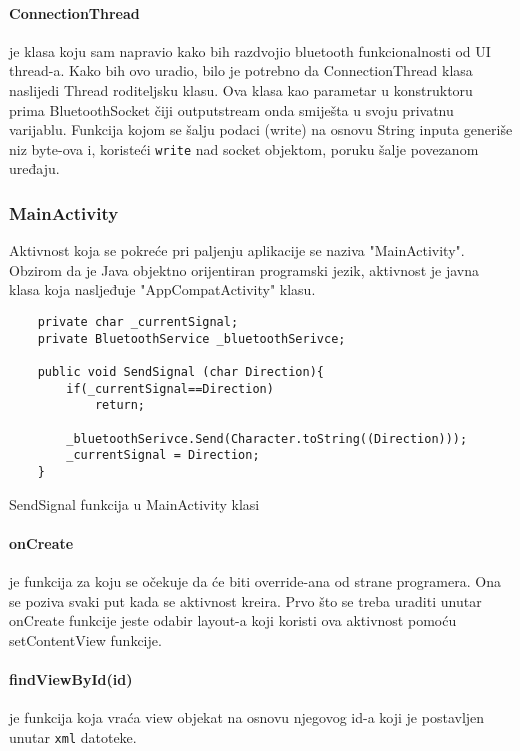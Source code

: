 \documentclass[../Document.tex]{subfiles}
\begin{document}
\paragraph{ConnectionThread} je klasa koju sam napravio kako bih razdvojio bluetooth funkcionalnosti od UI thread-a. Kako bih ovo uradio, bilo je potrebno da ConnectionThread klasa naslijedi Thread roditeljsku klasu. Ova klasa kao parametar u konstruktoru prima BluetoothSocket čiji outputstream onda smiješta u svoju privatnu varijablu. Funkcija kojom se šalju podaci (write) na osnovu String inputa generiše niz byte-ova i, koristeći \verb|write| nad socket objektom, poruku šalje povezanom uređaju.

\subsubsection{MainActivity}
Aktivnost koja se pokreće pri paljenju aplikacije se naziva "MainActivity". Obzirom da je Java objektno orijentiran programski jezik, aktivnost je javna klasa koja nasljeđuje "AppCompatActivity" klasu.

\begin{code}
    \begin{verbatim}
    private char _currentSignal;
    private BluetoothService _bluetoothSerivce;
    
    public void SendSignal (char Direction){
        if(_currentSignal==Direction)
            return;
    
        _bluetoothSerivce.Send(Character.toString((Direction)));
        _currentSignal = Direction;
    }
    \end{verbatim}
    \caption{SendSignal funkcija u MainActivity klasi}
\end{code}

\paragraph{onCreate} je funkcija za koju se očekuje da će biti override-ana od strane programera. Ona se poziva svaki put kada se aktivnost kreira. Prvo što se treba uraditi unutar onCreate funkcije jeste odabir layout-a koji koristi ova aktivnost pomoću setContentView funkcije.

\paragraph{findViewById(id)} je funkcija koja vraća view objekat na osnovu njegovog id-a koji je postavljen unutar \verb|xml| datoteke.
\end{document}
